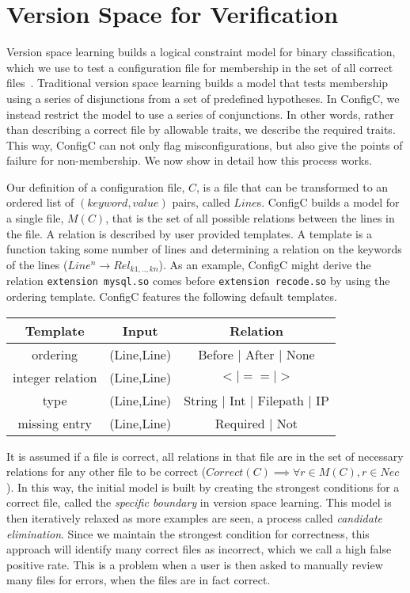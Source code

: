 \section{Version Space for Verification}

Version space learning builds a logical constraint model for binary classification, which we use to test a configuration file for membership in the set of all correct files~\cite{mitchell82}.
Traditional version space learning builds a model that tests membership using a series of disjunctions from a set of predefined hypotheses.
In ConfigC, we instead restrict the model to use a series of conjunctions.
In other words, rather than describing a correct file by allowable traits, we describe the required traits. 
This way, ConfigC can not only flag misconfigurations, but also give the points of failure for non-membership.
We now show in detail how this process works.

Our definition of a configuration file, $C$, is a file that can be transformed to an ordered list of $(keyword, value)$ pairs, called $Line$s.
ConfigC builds a model for a single file, $M(C)$, that is the set of all possible relations between the lines in the file.
A relation is described by user provided templates.
A template is a function taking some number of lines and determining a relation on the keywords of the lines ($Line^{n} \rightarrow Rel_{k1,..,kn}$).
As an example, ConfigC might derive the relation \texttt{extension mysql.so} comes before \texttt{extension recode.so} by using the ordering template.
ConfigC features the following default templates.

\begin{center}
\begin{tabular} {|c |c |c |}
 \hline
 Template & Input  & Relation \\
\hline
 ordering & (Line,Line) & Before $\vert$ After $\vert$ None \\
 \hline
 integer relation & (Line,Line)  & $< | == | >$  \\
\hline
 type & (Line,Line)  & String $\vert$ Int $\vert$ Filepath $\vert$ IP  \\
\hline
 missing entry & (Line,Line) & Required $\vert$ Not \\
\hline
\end{tabular}
\end{center}

It is assumed if a file is correct, all relations in that file are in the set of necessary relations for any other file to be correct ($Correct(C) \implies \forall r \in M(C), r \in Nec$).
In this way, the initial model is built by creating the strongest conditions for a correct file, called the \textit{specific boundary} in version space learning.
This model is then iteratively relaxed as more examples are seen, a process called \textit{candidate elimination}.
Since we maintain the strongest condition for correctness, this approach will identify many correct files as incorrect, which we call a high false positive rate.
This is a problem when a user is then asked to manually review many files for errors, when the files are in fact correct.

